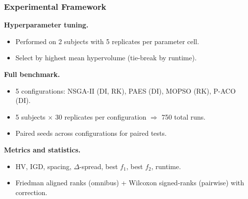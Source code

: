 \documentclass[aspectratio=169,10pt]{beamer}
\begin{document}
\begin{frame}
\frametitle{Experimental Framework}

\textbf{Hyperparameter tuning.}
\begin{itemize}
  \item Performed on 2 subjects with 5 replicates per parameter cell.
  \item Select by highest mean hypervolume (tie-break by runtime).
\end{itemize}

\vspace{0.3cm}

\textbf{Full benchmark.}
\begin{itemize}
  \item 5 configurations: NSGA-II (DI, RK), PAES (DI), MOPSO (RK), P-ACO (DI).
  \item 5 subjects $\times$ 30 replicates per configuration $\Rightarrow$ 750 total runs.
  \item Paired seeds across configurations for paired tests.
\end{itemize}

\vspace{0.3cm}

\textbf{Metrics and statistics.}
\begin{itemize}
  \item HV, IGD, spacing, $\Delta$-spread, best $f_1$, best $f_2$, runtime.
  \item Friedman aligned ranks (omnibus) + Wilcoxon signed-ranks (pairwise) with correction.
\end{itemize}

\end{frame}
\end{document}
